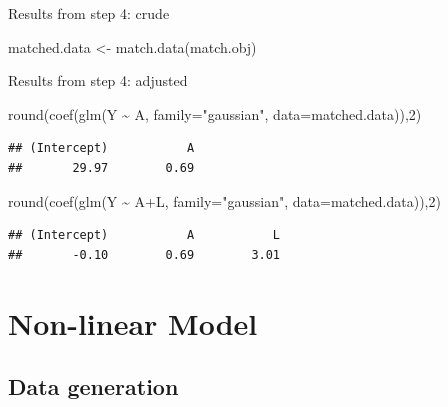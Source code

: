 \documentclass[
]{book}
\newenvironment{Shaded}{\begin{snugshade}}{\end{snugshade}}
\newcommand{\AttributeTok}[1]{\textcolor[rgb]{0.77,0.63,0.00}{#1}}
\newcommand{\DecValTok}[1]{\textcolor[rgb]{0.00,0.00,0.81}{#1}}
\newcommand{\FunctionTok}[1]{\textcolor[rgb]{0.00,0.00,0.00}{#1}}
\newcommand{\NormalTok}[1]{#1}
\newcommand{\OtherTok}[1]{\textcolor[rgb]{0.56,0.35,0.01}{#1}}
\newcommand{\SpecialCharTok}[1]{\textcolor[rgb]{0.00,0.00,0.00}{#1}}
\newcommand{\StringTok}[1]{\textcolor[rgb]{0.31,0.60,0.02}{#1}}
\begin{document}
Results from step 4: crude

\begin{Shaded}
\begin{Highlighting}[]
\NormalTok{matched.data }\OtherTok{\textless{}{-}} \FunctionTok{match.data}\NormalTok{(match.obj)}
\end{Highlighting}
\end{Shaded}

Results from step 4: adjusted

\begin{Shaded}
\begin{Highlighting}[]
\FunctionTok{round}\NormalTok{(}\FunctionTok{coef}\NormalTok{(}\FunctionTok{glm}\NormalTok{(Y }\SpecialCharTok{\textasciitilde{}}\NormalTok{ A, }\AttributeTok{family=}\StringTok{"gaussian"}\NormalTok{, }\AttributeTok{data=}\NormalTok{matched.data)),}\DecValTok{2}\NormalTok{)}
\end{Highlighting}
\end{Shaded}

\begin{verbatim}
## (Intercept)           A 
##       29.97        0.69
\end{verbatim}

\begin{Shaded}
\begin{Highlighting}[]
\FunctionTok{round}\NormalTok{(}\FunctionTok{coef}\NormalTok{(}\FunctionTok{glm}\NormalTok{(Y }\SpecialCharTok{\textasciitilde{}}\NormalTok{ A}\SpecialCharTok{+}\NormalTok{L, }\AttributeTok{family=}\StringTok{"gaussian"}\NormalTok{, }\AttributeTok{data=}\NormalTok{matched.data)),}\DecValTok{2}\NormalTok{)}
\end{Highlighting}
\end{Shaded}

\begin{verbatim}
## (Intercept)           A           L 
##       -0.10        0.69        3.01
\end{verbatim}

\hypertarget{non-linear-model}{%
\section{Non-linear Model}\label{non-linear-model}}

\hypertarget{data-generation}{%
\subsection{Data generation}\label{data-generation}}
\end{document}
